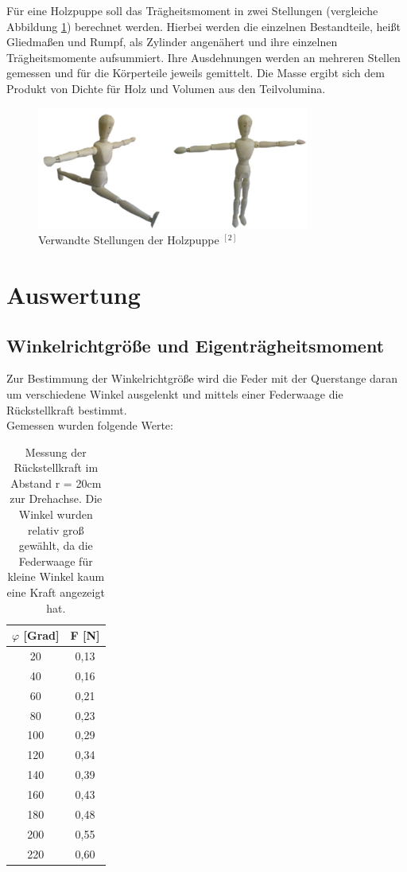 Für eine Holzpuppe soll das Trägheitsmoment in zwei Stellungen (vergleiche Abbildung \ref{pic_puppe}) berechnet werden. Hierbei werden
die einzelnen Bestandteile, heißt Gliedmaßen und Rumpf, als Zylinder angenähert und ihre einzelnen Trägheitsmomente aufsummiert. Ihre 
Ausdehnungen werden an mehreren Stellen gemessen und für die Körperteile jeweils gemittelt. Die Masse ergibt sich dem Produkt von Dichte für Holz
und Volumen aus den Teilvolumina.

\begin{figure}[H]
\includegraphics[width=0.8\textwidth]{pics/puppe.png}
\caption{Verwandte Stellungen der Holzpuppe $^{[2]}$}
\label{pic_puppe}
\end{figure}






\section{Auswertung}
\subsection{Winkelrichtgröße und Eigenträgheitsmoment}
Zur Bestimmung der Winkelrichtgröße wird die Feder mit der Querstange daran um verschiedene Winkel ausgelenkt und mittels einer Federwaage die Rückstellkraft bestimmt.\\
Gemessen wurden folgende Werte:
\begin{table}[htbp]
\begin{tabular}{|c|c|}
\hline 
$\varphi$ [Grad]&	F [N]\\ \hline
20	&0,13\\ \hline
40	&0,16\\ \hline
60	&0,21\\ \hline
80	&0,23\\ \hline
100	&0,29\\ \hline
120	&0,34\\ \hline
140	&0,39\\ \hline
160	&0,43\\ \hline
180	&0,48\\ \hline
200	&0,55\\ \hline
220	&0,60\\ \hline
\end{tabular} 
\caption{Messung der Rückstellkraft im Abstand r = 20cm zur Drehachse. Die Winkel wurden relativ groß gewählt, da die Federwaage für kleine Winkel kaum eine Kraft angezeigt hat.}
\end{table}

